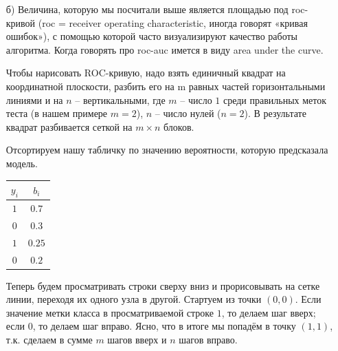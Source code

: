 \documentclass[12pt, a4paper, oneside]{article}
\begin{document}
{\begin{enumerate}
		\begin{equation} 
		\begin{aligned}
		& 0.7 > 0.2 \qquad & ok \\
		& 0.7 > 0.3 \qquad & ok \\
		& 0.25 > 0.2 \qquad & ok \\ 
		& 0.25 < 0.3 \qquad & not \mbox{ } ok \\
		\end{aligned}
		\end{equation} 
		
		Видим, что модель ошиблась в упорядочивании один раз. $roc_auc$ --- это доля пар, где модель оказалась права. В нашем случае это $0.75$. $roc_auc$ принимает значения от $0.5$ до $1$, если её значения близки к $0.5$, наш алгоритм ничем не лучше монетки, потому что он упорядочивает пары из унывших и нормальных абы как. 
		
		Такая метрика позволяет не привязываться к конкретному значению порога и видеть насколько классно у модели выходит упорядочивать пары объектов. 
		
		\item[б)]  Величина, которую мы посчитали выше является площадью под roc-кривой (roc = receiver operating characteristic, иногда говорят «кривая ошибок»), с помощью которой часто визуализируют качество работы алгоритма.  Когда говорять про roc-auc имется в виду area under the curve. 
		
		Чтобы нарисовать ROC-кривую, надо взять единичный квадрат на координатной плоскости, разбить его на m равных частей горизонтальными линиями и на $n$ – вертикальными, где $m$ – число $1$ среди правильных меток теста (в нашем примере $m=2$), $n$ – число нулей ($n=2$). В результате квадрат разбивается сеткой на $m \times n$ блоков.
		
		Отсортируем нашу табличку по значению вероятности, которую предсказала модель. 
		
		\begin{center}
			\begin{tabular}{c|c}
				$y_i$ & $b_i$ \\
				\hline
				$1$  & $0.7$ \\
				$0$ & $0.3$ \\
				$1$ & $0.25$ \\
				$0$ & $0.2$ \\
			\end{tabular}
		\end{center}
		
		Теперь будем просматривать строки сверху вниз и прорисовывать на сетке линии, переходя их одного узла в другой. Стартуем из точки $(0, 0)$. Если значение метки класса в просматриваемой строке $1$, то делаем шаг вверх; если $0$, то делаем шаг вправо. Ясно, что в итоге мы попадём в точку $(1, 1)$, т.к. сделаем в сумме $m$ шагов вверх и $n$ шагов вправо.
		

\end{enumerate}}
\end{document}

